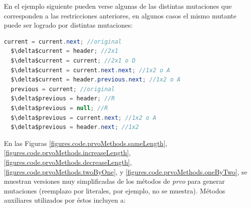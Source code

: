 En el ejemplo siguiente pueden verse algunas de las distintas mutaciones que corresponden a las restricciones anteriores, en algunos casos el mismo mutante puede ser logrado por distintas mutaciones:
\begin{lstlisting}[mathescape=true,language=Java,basicstyle={}]
  current = current.next; //original
  $\delta$current = header; //2x1
  $\delta$current = current; //2x1 o D 
  $\delta$current = current.next.next; //1x2 o A
  $\delta$current = header.previous.next; //1x2 o A
  previous = current; //original
  $\delta$previous = header; //R
  $\delta$previous = null; //R
  $\delta$previous = current.next; //1x2 o A
  $\delta$previous = header.next; //1x2
\end{lstlisting}

En las Figuras \ref{figures.code.prvoMethods.sameLength}, \ref{figures.code.prvoMethods.increaseLength}, \ref{figures.code.prvoMethods.decreaseLength}, \ref{figures.code.prvoMethods.twoByOne}, y \ref{figures.code.prvoMethods.oneByTwo}, se muestran versiones muy simplificadas de los m\'etodos de \emph{prvo} para generar mutaciones (reemplazo por literales, por ejemplo, no se muestra). M\'etodos auxiliares utilizados por \'estos incluyen a:

